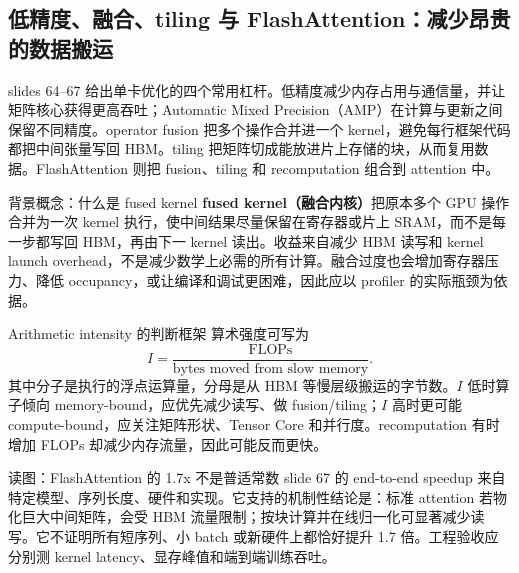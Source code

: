 \subsection{低精度、融合、tiling 与 FlashAttention：减少昂贵的数据搬运}

slides 64--67 给出单卡优化的四个常用杠杆。低精度减少内存占用与通信量，并让矩阵核心获得更高吞吐；Automatic Mixed Precision（AMP）在计算与更新之间保留不同精度。operator fusion 把多个操作合并进一个 kernel，避免每行框架代码都把中间张量写回 HBM。tiling 把矩阵切成能放进片上存储的块，从而复用数据。FlashAttention 则把 fusion、tiling 和 recomputation 组合到 attention 中。


\begin{knowledgebox}{背景概念：什么是 fused kernel}
\textbf{fused kernel（融合内核）}把原本多个 GPU 操作合并为一次 kernel 执行，使中间结果尽量保留在寄存器或片上 SRAM，而不是每一步都写回 HBM，再由下一 kernel 读出。收益来自减少 HBM 读写和 kernel launch overhead，不是减少数学上必需的所有计算。融合过度也会增加寄存器压力、降低 occupancy，或让编译和调试更困难，因此应以 profiler 的实际瓶颈为依据。
\end{knowledgebox}

\begin{importantbox}{Arithmetic intensity 的判断框架}
算术强度可写为
\[
I=\frac{\text{FLOPs}}{\text{bytes moved from slow memory}}.
\]
其中分子是执行的浮点运算量，分母是从 HBM 等慢层级搬运的字节数。$I$ 低时算子倾向 memory-bound，应优先减少读写、做 fusion/tiling；$I$ 高时更可能 compute-bound，应关注矩阵形状、Tensor Core 和并行度。recomputation 有时增加 FLOPs 却减少内存流量，因此可能反而更快。
\end{importantbox}

\begin{knowledgebox}{读图：FlashAttention 的 1.7x 不是普适常数}
slide 67 的 end-to-end speedup 来自特定模型、序列长度、硬件和实现。它支持的机制性结论是：标准 attention 若物化巨大中间矩阵，会受 HBM 流量限制；按块计算并在线归一化可显著减少读写。它不证明所有短序列、小 batch 或新硬件上都恰好提升 1.7 倍。工程验收应分别测 kernel latency、显存峰值和端到端训练吞吐。
\end{knowledgebox}

